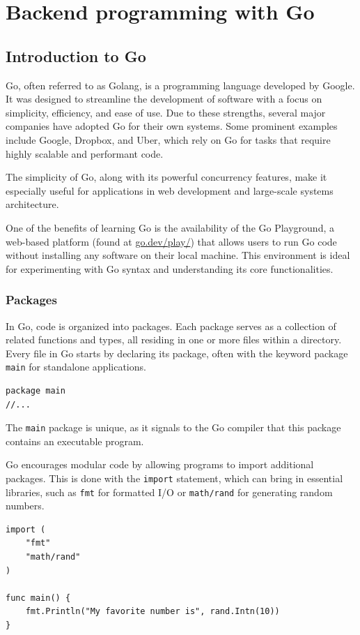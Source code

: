 \chapter{Backend programming with Go}
\section{Introduction to Go}
Go, often referred to as Golang, is a programming language developed by Google. It was designed to streamline the development of software with a focus on simplicity, efficiency, and ease of use. Due to these strengths, several major companies have adopted Go for their own systems. Some prominent examples include Google, Dropbox, and Uber, which rely on Go for tasks that require highly scalable and performant code.

The simplicity of Go, along with its powerful concurrency features, make it especially useful for applications in web development and large-scale systems architecture.

One of the benefits of learning Go is the availability of the Go Playground, a web-based platform (found at \href{https://go.dev/play/}{go.dev/play/}) that allows users to run Go code without installing any software on their local machine. This environment is ideal for experimenting with Go syntax and understanding its core functionalities.

\subsection*{Packages}
In Go, code is organized into packages. Each package serves as a collection of related functions and types, all residing in one or more files within a directory. Every file in Go starts by declaring its package, often with the keyword package \texttt{main} for standalone applications.

\begin{verbatim}
package main
//... 
\end{verbatim}
The \texttt{main} package is unique, as it signals to the Go compiler that this package contains an executable program.

Go encourages modular code by allowing programs to import additional packages. This is done with the \texttt{import} statement, which can bring in essential libraries, such as \texttt{fmt} for formatted I/O or \texttt{math/rand} for generating random numbers.

\begin{verbatim}
import (
    "fmt"
    "math/rand"
)

func main() {
    fmt.Println("My favorite number is", rand.Intn(10))
}
\end{verbatim}

